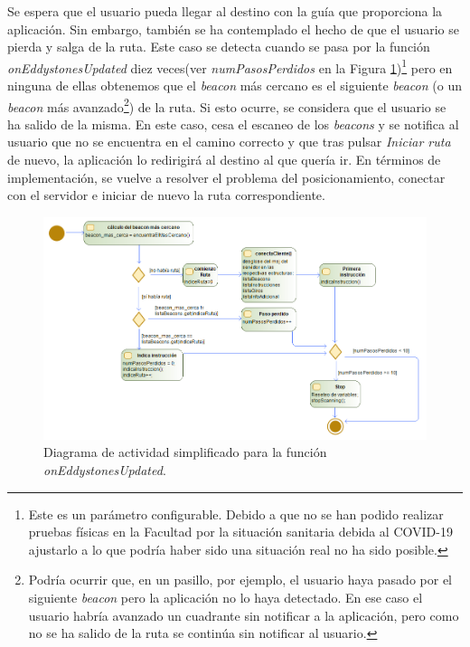 \begin{itemize}
	Se espera que el usuario pueda llegar al destino con la guía que proporciona la aplicación. Sin embargo, también se ha contemplado el hecho de que el usuario se pierda y salga de la ruta. Este caso se detecta cuando se pasa por la función \textit{onEddystonesUpdated} diez veces(ver \textit{numPasosPerdidos} en la Figura \ref{fig:diag_clienteSeguimientoRuta})\footnote{Este es un parámetro configurable. Debido a que no se han podido realizar pruebas físicas en la Facultad por la situación sanitaria debida al COVID-19 ajustarlo a lo que podría haber sido una situación real no ha sido posible.} pero en ninguna de ellas obtenemos que el \textit{beacon} más cercano es el siguiente \textit{beacon} (o un \textit{beacon} más avanzado\footnote{Podría ocurrir que, en un pasillo, por ejemplo, el usuario haya pasado por el siguiente \textit{beacon} pero la aplicación no lo haya detectado. En ese caso el usuario habría avanzado un cuadrante sin notificar a la aplicación, pero como no se ha salido de la ruta se continúa sin notificar al usuario.}) de la ruta. Si esto ocurre, se considera que el usuario se ha salido de la misma. En este caso, cesa el escaneo de los \textit{beacons} y se notifica al usuario que no se encuentra en el camino correcto y que tras pulsar \textit{Iniciar ruta} de nuevo, la aplicación lo redirigirá al destino al que quería ir. En términos de implementación, se vuelve a resolver el problema del posicionamiento, conectar con el servidor e iniciar de nuevo la ruta correspondiente. 
	

	\begin{figure}[t]
		\centering
		\includegraphics[width=1\textwidth]{Imagenes/Capitulo4/diagramasUML/onEddystonesUpdated}
		\caption{Diagrama de actividad simplificado para la función \textit{onEddystonesUpdated}.}
		\label{fig:diag_clienteSeguimientoRuta}
	\end{figure}
	
\end{itemize}


